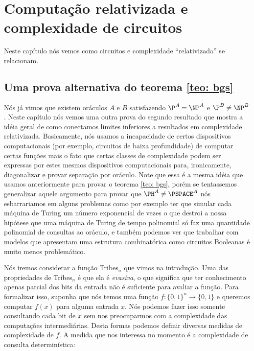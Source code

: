 \chapter{Computação relativizada e complexidade de circuitos} \label{chapter_oracles_and_circuit_complexity}

Neste capítulo nós vemos como circuitos e complexidade ``relativizada'' se relacionam.

\section{Uma prova alternativa do teorema \ref{teo: bgs}} \label{section_alternative_proof_bgs}

Nós já vimos que existem oráculos $A$ e $B$ satisfazendo $\P^{A} = \NP^{A}$ e $\P^{B} \neq \NP^{B}$. Neste capítulo nós vemos uma outra prova do segundo resultado que mostra a idéia geral de como conectamos limites inferiores a resultados em complexidade relativizada. Basicamente, nós usamos a incapacidade de certos dispositivos computacionais (por exemplo, circuitos de baixa profundidade) de computar certas funções mais o fato que certas classes de complexidade podem ser expressas por estes mesmos dispositivos computacionais para, ironicamente, diagonalizar e provar separação por oráculo. Note que essa é a mesma idéia que usamos anteriormente para provar o teorema \ref{teo: bgs}, porém se tentassemos generalizar aquele argumento para provar que $\PH^{A} \neq \PSPACE^{A}$ nós esbarrariamos em alguns problemas como por exemplo ter que simular cada máquina de Turing um número exponencial de vezes o que destroi a nossa hipótese que uma máquina de Turing de tempo polinomial só faz uma quantidade polinomial de consultas ao oráculo, e também podemos ver que trabalhar com modelos que apresentam uma estrutura combinatórica como circuitos Booleanas é muito menos problemático.

Nós iremos considerar a função Tribes$_{n}$ que vimos na introdução. Uma das propriedades de Tribes$_{n}$ é que ela é \emph{evasiva}, o que significa que ter conhecimento apenas parcial dos bits da entrada não é suficiente para avaliar a função. Para formalizar isso, suponha que nós temos uma função $f: \{0, 1\}^{n} \to \{0, 1\}$ e queremos computar $f(x)$ para alguma entrada $x$. Nós podemos fazer isso somente consultando cada bit de $x$ sem nos preocuparmos com a complexidade das computações intermediárias. Desta formas podemos definir diversas medidas de complexidade de $f$. A medida que nos interessa no momento é a complexidade de consulta determinística:

